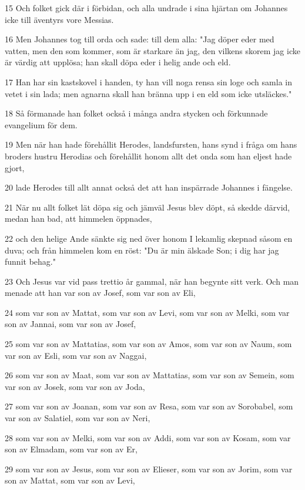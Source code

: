 \par 15 Och folket gick där i förbidan, och alla undrade i sina hjärtan om Johannes icke till äventyrs vore Messias.
\par 16 Men Johannes tog till orda och sade: till dem alla: "Jag döper eder med vatten, men den som kommer, som är starkare än jag, den vilkens skorem jag icke är värdig att upplösa; han skall döpa eder i helig ande och eld.
\par 17 Han har sin kastskovel i handen, ty han vill noga rensa sin loge och samla in vetet i sin lada; men agnarna skall han bränna upp i en eld som icke utsläckes."
\par 18 Så förmanade han folket också i många andra stycken och förkunnade evangelium för dem.
\par 19 Men när han hade förehållit Herodes, landsfursten, hans synd i fråga om hans broders hustru Herodias och förehållit honom allt det onda som han eljest hade gjort,
\par 20 lade Herodes till allt annat också det att han inspärrade Johannes i fängelse.
\par 21 När nu allt folket lät döpa sig och jämväl Jesus blev döpt, så skedde därvid, medan han bad, att himmelen öppnades,
\par 22 och den helige Ande sänkte sig ned över honom I lekamlig skepnad såsom en duva; och från himmelen kom en röst: "Du är min älskade Son; i dig har jag funnit behag."
\par 23 Och Jesus var vid pass trettio år gammal, när han begynte sitt verk. Och man menade att han var son av Josef, som var son av Eli,
\par 24 som var son av Mattat, som var son av Levi, som var son av Melki, som var son av Jannai, som var son av Josef,
\par 25 som var son av Mattatias, som var son av Amos, som var son av Naum, som var son av Esli, som var son av Naggai,
\par 26 som var son av Maat, som var son av Mattatias, som var son av Semein, som var son av Josek, som var son av Joda,
\par 27 som var son av Joanan, som var son av Resa, som var son av Sorobabel, som var son av Salatiel, som var son av Neri,
\par 28 som var son av Melki, som var son av Addi, som var son av Kosam, som var son av Elmadam, som var son av Er,
\par 29 som var son av Jesus, som var son av Elieser, som var son av Jorim, som var son av Mattat, som var son av Levi,
